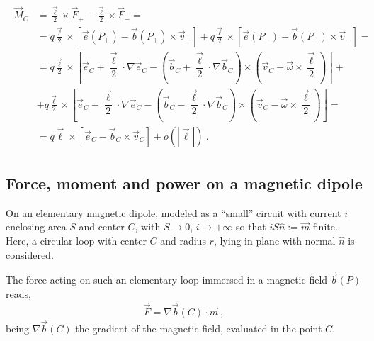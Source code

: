 \documentclass[letterpaper,10pt,english]{jupyterBook}
\begin{document}
\begin{equation*}
\begin{split}\begin{aligned}
  \vec{M}_C
   & = \frac{\vec{\ell}}{2} \times \vec{F}_+ - \frac{\vec{\ell}}{2} \times \vec{F}_- = \\
   & = q \frac{\vec{\ell}}{2} \times \left[ \vec{e}(P_+) - \vec{b}(P_+) \times \vec{v}_{+} \right] + q \frac{\vec{\ell}}{2} \times \left[ \vec{e}(P_-) - \vec{b}(P_-) \times \vec{v}_{-} \right] = \\
   & = q \frac{\vec{\ell}}{2} \times \left[ \vec{e}_C + \dfrac{\vec{\ell}}{2} \cdot \nabla \vec{e}_C - \left( \vec{b}_C + \dfrac{\vec{\ell}}{2} \cdot \nabla \vec{b}_C \right) \times \left( \vec{v}_C + \vec{\omega} \times \dfrac{\vec{\ell}}{2} \right) \right] + \\ 
   & + q \frac{\vec{\ell}}{2} \times \left[ \vec{e}_C - \dfrac{\vec{\ell}}{2} \cdot \nabla \vec{e}_C - \left( \vec{b}_C - \dfrac{\vec{\ell}}{2} \cdot \nabla \vec{b}_C \right) \times \left( \vec{v}_C - \vec{\omega} \times \dfrac{\vec{\ell}}{2} \right) \right] = \\
   & = q \vec{\ell} \times \left[ \vec{e}_C - \vec{b}_C \times \vec{v}_C \right] + o(|\vec{\ell}|) \ .
\end{aligned}\end{split}
\end{equation*}
\sphinxAtStartPar
{} 




\subsection{Force, moment and power on a magnetic dipole}
\label{\detokenize{ch/forces-moments-on-charges:force-moment-and-power-on-a-magnetic-dipole}}
\sphinxAtStartPar
On an elementary magnetic dipole, modeled as a “small” circuit with current \(i\) enclosing area \(S\) and center \(C\), with \(S \rightarrow 0\), \(i \rightarrow + \infty\) so that \(i S \hat{n} := \vec{m}\) finite. Here, a circular loop with center \(C\) and radius \(r\), lying in plane with normal \(\hat{n}\) is considered.

\sphinxAtStartPar
{} The force acting on such an elementary loop immersed in a magnetic field \(\vec{b}(P)\) reads,
\begin{equation*}
\begin{split}\vec{F} = \nabla \vec{b}(C) \cdot \vec{m} \ ,\end{split}
\end{equation*}
\sphinxAtStartPar
being \(\nabla \vec{b}(C)\) the gradient of the magnetic field, evaluated in the point \(C\).
\end{document}
